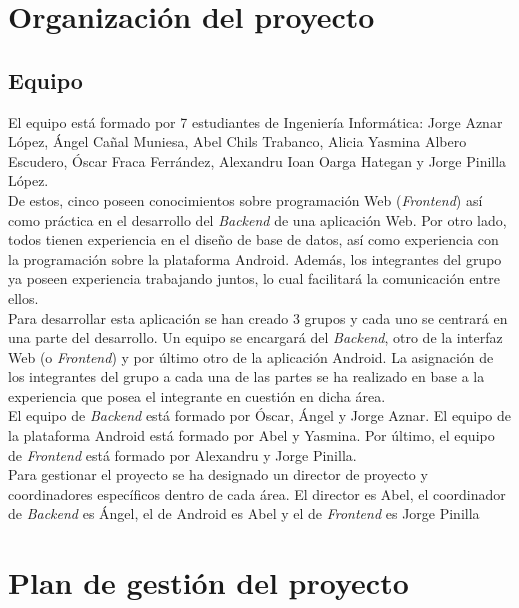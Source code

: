 \documentclass[12pt]{article}%
\begin{document}

\section{Organizaci\'on del proyecto} %
\subsection{Equipo}

El equipo est\'a formado por 7 estudiantes de Ingenier\'ia Inform\'atica: Jorge Aznar L\'opez, \'Angel Ca\~nal Muniesa, Abel Chils Trabanco, Alicia Yasmina Albero Escudero, \'Oscar Fraca Ferr\'andez, Alexandru Ioan Oarga Hategan y Jorge Pinilla L\'opez.\\

De estos, cinco poseen conocimientos sobre programaci\'on Web (\textit{Frontend}) as\'i como pr\'actica en el desarrollo del \textit{Backend} de una aplicaci\'on Web. Por otro lado, todos tienen experiencia en el dise\~no de base de datos, as\'i como experiencia con la programaci\'on sobre la plataforma Android. Adem\'as, los integrantes del grupo ya poseen experiencia trabajando juntos, lo cual facilitar\'a la comunicaci\'on entre ellos. \\

Para desarrollar esta aplicaci\'on se han creado 3 grupos y cada uno se centrar\'a en una parte del desarrollo. Un equipo se encargar\'a del
\textit{Backend}, otro de la interfaz Web (o \textit{Frontend}) y por \'ultimo otro de la aplicaci\'on Android. La asignaci\'on de los integrantes del grupo a cada una de las partes se ha realizado en base a la experiencia que posea el integrante en cuesti\'on en dicha \'area.\\

El equipo de \textit{Backend} est\'a formado por \'Oscar, \'Angel y Jorge Aznar. El equipo de la plataforma Android est\'a formado por Abel y Yasmina. Por \'ultimo, el equipo de \textit{Frontend} est\'a formado por Alexandru y Jorge Pinilla. \\

Para gestionar el proyecto se ha designado un director de proyecto y coordinadores espec\'ificos dentro de cada \'area. El director es Abel, el coordinador de \textit{Backend} es \'Angel, el de Android es Abel y el de \textit{Frontend} es Jorge Pinilla


\section{Plan de gesti\'on del proyecto} %
\end{document}
